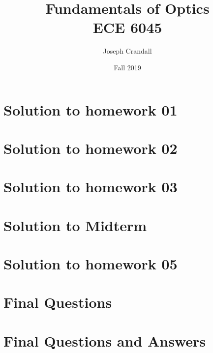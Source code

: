 

\usepackage{subfiles}
\usepackage{color,soul}
\usepackage{siunitx}
\usepackage{gensymb}

\title{Fundamentals of Optics\\
\large ECE 6045}
\author{Joseph Crandall}
\date{Fall 2019}


\maketitle

\section{Solution to homework 01}


\section{Solution to homework 02}


\section{Solution to homework 03}


%

\section{Solution to Midterm}


\section{Solution to homework 05}


\section{Final Questions}


\section{Final Questions and Answers}



